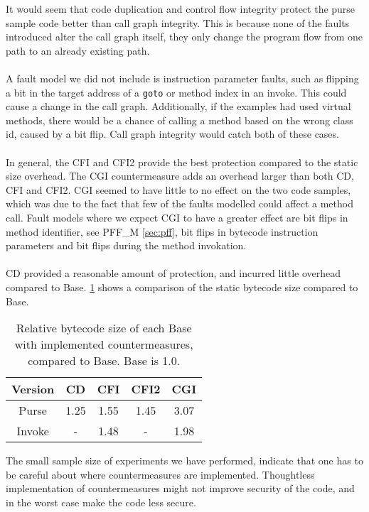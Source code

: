 It would seem that code duplication and control flow integrity protect the \jc purse sample code better than call graph integrity. This is because none of the faults introduced alter the call graph itself, they only change the program flow from one path to an already existing path.\\\\
A fault model we did not include is instruction parameter faults, such as flipping a bit in the target address of a \texttt{goto} or method index in an invoke. This could cause a change in the call graph. Additionally, if the examples had used virtual methods, there would be a chance of calling a method based on the wrong class id, caused by a bit flip. Call graph integrity would catch both of these cases.\\\\
In general, the CFI and CFI2 provide the best protection compared to the static size overhead. The CGI countermeasure adds an overhead larger than both CD, CFI and CFI2. CGI seemed to have little to no effect on the two code samples, which was due to the fact that few of the faults modelled could affect a method call. Fault models where we expect CGI to have a greater effect are bit flips in method identifier, see PFF\_M \cref{sec:pff}, bit flips in bytecode instruction parameters and bit flips during the method invokation.\\\\
CD provided a reasonable amount of protection, and incurred little overhead compared to Base. \cref{tab:staticSize} shows a comparison of the static bytecode size compared to Base.

\begin{table}[H]
\centering
\begin{tabular}{|c|c|c|c|c|}
\hline Version & CD & CFI & CFI2 & CGI \\ 
\hline Purse & 1.25 & 1.55 & 1.45 & 3.07 \\ 
\hline Invoke & - & 1.48 & - & 1.98 \\ 
\hline 
\end{tabular} 
    \caption{Relative bytecode size of each Base with implemented countermeasures, compared to Base. Base is 1.0.}
\label{tab:staticSize}
\end{table}

\noindent The small sample size of experiments we have performed, indicate that one has to be careful about where countermeasures are implemented. Thoughtless implementation of countermeasures might not improve security of the code, and in the worst case make the code less secure. 